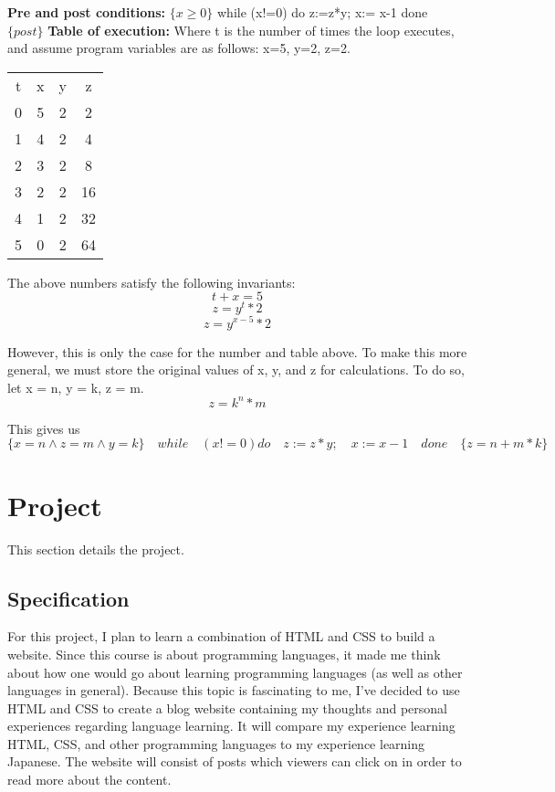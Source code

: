 \documentclass{article}
\theoremstyle{theorem}
\theoremstyle{definition}
\theoremstyle{remark}
\begin{document}
\textbf{Pre and post conditions:}
\newline $\{x \geq 0\}$  while (x!=0) do  z:=z*y; x:= x-1 done $\{post\}$ \newline
\textbf{Table of execution:}
\newline Where t is the number of times the loop executes, and assume program variables are as follows: x=5, y=2, z=2.
\begin{center}
\begin{tabular}{ c c c c }
 t & x & y & z \\ 
 0 & 5 & 2 & 2 \\  
 1 & 4 & 2 & 4 \\
 2 & 3 & 2 & 8 \\
 3 & 2 & 2 & 16 \\
 4 & 1 & 2 & 32 \\
 5 & 0 & 2 & 64 
\end{tabular}
\end{center}
The above numbers satisfy the following invariants:
\[t + x = 5\]
\[z = y^t * 2\]
\[z = y^{x-5} * 2\]

However, this is only the case for the number and table above. To make this more general, we must store the original values of x, y, and z for calculations. To do so, let x = n, y = k, z = m.
\[z = k^n * m \] 

This gives us 
\[\{x=n \wedge z=m \wedge y=k\} \quad while \quad (x!=0) do \quad z:=z*y; \quad x:= x-1 \quad done \quad \{z=n+m*k\}\]
 
\section{Project}

This section details the project.

\subsection{Specification}
For this project, I plan to learn a combination of HTML and CSS to build a website. Since this course is about programming languages, it made me think about how one would go about learning programming languages (as well as other languages in general). Because this topic is fascinating to me, I've decided to use HTML and CSS to create a blog website containing my thoughts and personal experiences regarding language learning. It will compare my experience learning HTML, CSS, and other programming languages to my experience learning Japanese. The website will consist of posts which viewers can click on in order to read more about the content.
\end{document}
